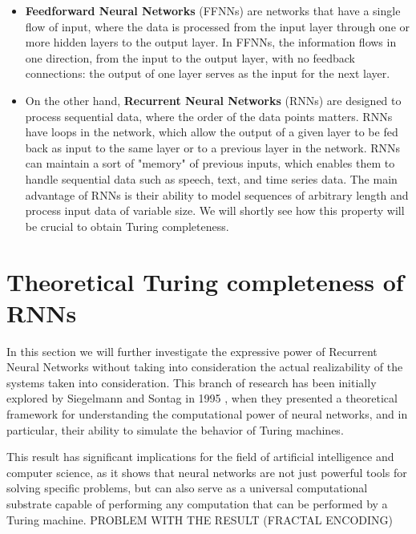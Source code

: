 \documentclass{article}
\begin{document}
\begin{itemize}
    \item \textbf{Feedforward Neural Networks} (FFNNs) are networks that have a single flow of input, where the data is processed from the input layer through one or more hidden layers to the output layer. In FFNNs, the information flows in one direction, from the input to the output layer, with no feedback connections: the output of one layer serves as the input for the next layer.

    \item On the other hand, \textbf{Recurrent Neural Networks} (RNNs) are designed to process sequential data, where the order of the data points matters. RNNs have loops in the network, which allow the output of a given layer to be fed back as input to the same layer or to a previous layer in the network. RNNs can maintain a sort of "memory" of previous inputs, which enables them to handle sequential data such as speech, text, and time series data. The main advantage of RNNs is their ability to model sequences of arbitrary length and process input data of variable size. We will shortly see how this property will be crucial to obtain Turing completeness.
\end{itemize}

\section{Theoretical Turing completeness of RNNs}\label{sec:theoretical}

In this section we will further investigate the expressive power of Recurrent Neural Networks without taking into consideration the actual realizability of the systems taken into consideration. This branch of research has been initially explored by Siegelmann and Sontag in 1995 \cite{SIE95}, when they presented a theoretical framework for understanding the computational power of neural networks, and in particular, their ability to simulate the behavior of Turing machines.

This result has significant implications for the field of artificial intelligence and computer science, as it shows that neural networks are not just powerful tools for solving specific problems, but can also serve as a universal computational substrate capable of performing any computation that can be performed by a Turing machine. PROBLEM WITH THE RESULT (FRACTAL ENCODING)

\end{document}

